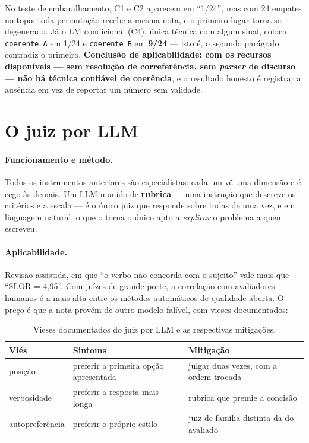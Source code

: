 \documentclass[11pt,a4paper]{article}
\newcommand{\dimtable}[1]{\small #1}
\begin{document}
No teste de embaralhamento, C1 e C2 aparecem em ``1\textordmasculine/24'', mas com 24 empates no
topo: toda permutação recebe a mesma nota, e o primeiro lugar torna-se degenerado. Já o LM
condicional (C4), única técnica com algum sinal, coloca \texttt{coerente\_A} em
1\textordmasculine/24 e \texttt{coerente\_B} em \textbf{9\textordmasculine/24} --- isto é, o segundo
parágrafo contradiz o primeiro. \textbf{Conclusão de aplicabilidade: com os recursos disponíveis ---
sem resolução de correferência, sem \textit{parser} de discurso --- não há técnica confiável de
coerência}, e o resultado honesto é registrar a ausência em vez de reportar um número sem validade.

\section{O juiz por LLM}
\label{sec:llm}

\paragraph{Funcionamento e método.} Todos os instrumentos anteriores são especialistas: cada um vê
uma dimensão e é cego às demais. Um LLM munido de \textbf{rubrica} --- uma instrução que descreve os
critérios e a escala --- é o único juiz que responde sobre todas de uma vez, e em linguagem natural,
o que o torna o único apto a \emph{explicar} o problema a quem escreveu.

\paragraph{Aplicabilidade.} Revisão assistida, em que ``o verbo não concorda com o sujeito'' vale
mais que ``SLOR = 4,95''. Com juízes de grande porte, a correlação com avaliadores humanos é a mais
alta entre os métodos automáticos de qualidade aberta. O preço é que a nota provém de outro modelo
falível, com vieses documentados:

\begin{table}[H]
\centering
\dimtable{
\begin{tabular}{@{}lll@{}}
\toprule
\textbf{Viés} & \textbf{Sintoma} & \textbf{Mitigação} \\
\midrule
posição         & preferir a primeira opção apresentada & julgar duas vezes, com a ordem trocada \\
verbosidade     & preferir a resposta mais longa        & rubrica que premie a concisão \\
autopreferência & preferir o próprio estilo             & juiz de família distinta da do avaliado \\
\bottomrule
\end{tabular}}
\caption{Vieses documentados do juiz por LLM e as respectivas mitigações.}
\label{tab:vieses}
\end{table}
\end{document}
